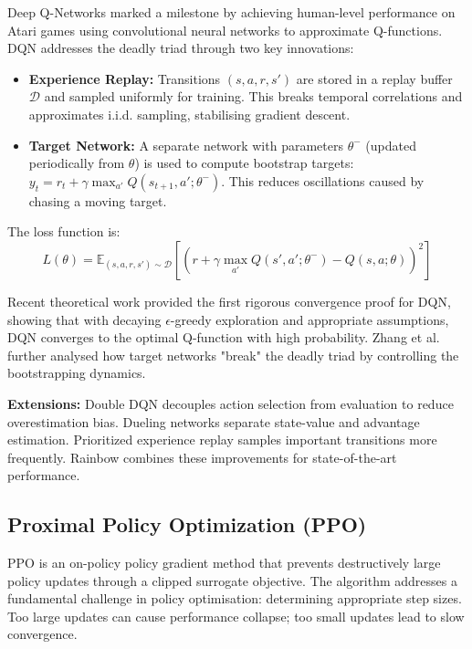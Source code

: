\documentclass[12pt,a4paper]{report}
\begin{document}
Deep Q-Networks \cite{mnih2015humanlevel} marked a milestone by achieving human-level performance on Atari games using convolutional neural networks to approximate Q-functions. DQN addresses the deadly triad through two key innovations:

\begin{itemize}
    \item \textbf{Experience Replay:} Transitions $(s, a, r, s')$ are stored in a replay buffer $\mathcal{D}$ and sampled uniformly for training. This breaks temporal correlations and approximates i.i.d. sampling, stabilising gradient descent.
    \item \textbf{Target Network:} A separate network with parameters $\theta^-$ (updated periodically from $\theta$) is used to compute bootstrap targets: $y_t = r_t + \gamma \max_{a'} Q(s_{t+1}, a'; \theta^-)$. This reduces oscillations caused by chasing a moving target.
\end{itemize}

The loss function is:
\begin{equation}
L(\theta) = \mathbb{E}_{(s,a,r,s') \sim \mathcal{D}} \left[ \left( r + \gamma \max_{a'} Q(s', a'; \theta^-) - Q(s, a; \theta) \right)^2 \right]
\end{equation}

Recent theoretical work \cite{zhang2023convergence} provided the first rigorous convergence proof for DQN, showing that with decaying $\epsilon$-greedy exploration and appropriate assumptions, DQN converges to the optimal Q-function with high probability. Zhang et al. \cite{zhang2021breaking} further analysed how target networks "break" the deadly triad by controlling the bootstrapping dynamics.

\textbf{Extensions:} Double DQN \cite{vanhasselt2015deep} decouples action selection from evaluation to reduce overestimation bias. Dueling networks \cite{wang2016dueling} separate state-value and advantage estimation. Prioritized experience replay \cite{schaul2016prioritized} samples important transitions more frequently. Rainbow \cite{hessel2017rainbow} combines these improvements for state-of-the-art performance.

\subsection{Proximal Policy Optimization (PPO)}

PPO \cite{schulman2017ppo} is an on-policy policy gradient method that prevents destructively large policy updates through a clipped surrogate objective. The algorithm addresses a fundamental challenge in policy optimisation: determining appropriate step sizes. Too large updates can cause performance collapse; too small updates lead to slow convergence.
\end{document}
